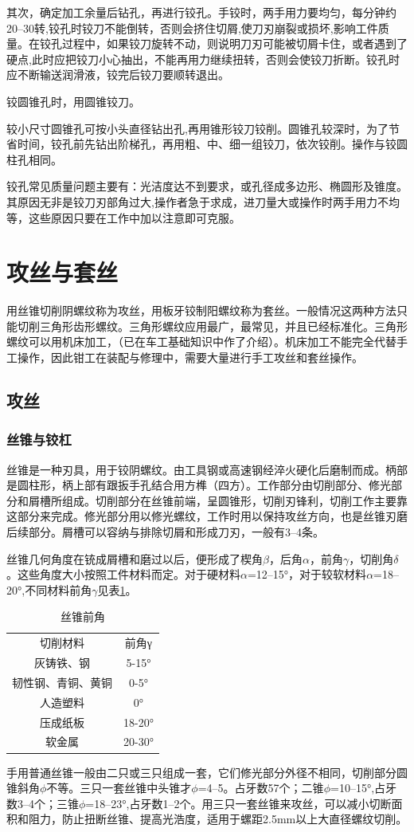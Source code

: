 \documentclass{ctexbook}
\begin{document}
其次，确定加工余量后钻孔，再进行铰孔。手铰时，两手用力要均匀，每分钟约20--30转,铰孔时铰刀不能倒转，否则会挤住切屑,使刀刃崩裂或损坏,影响工件质量。在铰孔过程中，如果铰刀旋转不动，则说明刀刃可能被切屑卡住，或者遇到了硬点,此时应把铰刀小心抽出，不能再用力继续扭转，否则会使铰刀折断。铰孔时应不断输送润滑液，铰完后铰刀要顺转退出。

铰圆锥孔时，用圆锥铰刀。

较小尺寸圆锥孔可按小头直径钻出孔,再用锥形铰刀铰削。圆锥孔较深时，为了节省时间，铰孔前先钻出阶梯孔，再用粗、中、细一组铰刀，依次铰削。操作与铰圆柱孔相同。

铰孔常见质量问题主要有：光洁度达不到要求，或孔径成多边形、椭圆形及锥度。其原因无非是铰刀刃部角过大,操作者急于求成，进刀量大或操作时两手用力不均等，这些原因只要在工作中加以注意即可克服。
\section{攻丝与套丝}
用丝锥切削阴螺纹称为攻丝，用板牙铰制阳螺纹称为套丝。一般情况这两种方法只能切削三角形齿形螺纹。三角形螺纹应用最广，最常见，并且已经标准化。三角形螺纹可以用机床加工，（已在车工基础知识中作了介绍）。机床加工不能完全代替手工操作，因此钳工在装配与修理中，需要大量进行手工攻丝和套丝操作。
\subsection{攻丝}
\subsubsection{丝锥与铰杠}
丝锥是一种刃具，用于铰阴螺纹。由工具钢或高速钢经淬火硬化后磨制而成。柄部是圆柱形，柄上部有跟扳手孔结合用方榫（四方）。工作部分由切削部分、修光部分和屑槽所组成。切削部分在丝锥前端，呈圆锥形，切削刃锋利，切削工作主要靠这部分来完成。修光部分用以修光螺纹，工作时用以保持攻丝方向，也是丝锥刃磨后续部分。屑槽可以容纳与排除切屑和形成刀刃，一般有3--4条。

丝锥几何角度在铳成屑槽和磨过以后，便形成了楔角$\beta$，后角$\alpha$，前角$\gamma$，切削角$\delta$。这些角度大小按照工件材料而定。对于硬材料$\alpha$=12--15°，对于较软材料$\alpha$=18--20°,不同材料前角$\gamma$见表\ref{tab:sizhuiqianjiao}。
\begin{table}[htbp]
	\centering
	\caption{丝锥前角}
	\begin{tabular}{cc}
		切削材料  & 前角γ \\
		灰铸铁、钢 & 5-15° \\
		韧性钢、青铜、黄铜 & 0-5° \\
		人造塑料  & 0° \\
		压成纸板  & 18-20° \\
		软金属   & 20-30° \\
	\end{tabular}%
	\label{tab:sizhuiqianjiao}%
\end{table}%
手用普通丝锥一般由二只或三只组成一套，它们修光部分外径不相同，切削部分圆锥斜角$\phi$不等。三只一套丝锥中头锥才$\phi$=4--5。占牙数57个；二锥$\phi$=10--15°,占牙数3--4个；三锥$\phi$=18--23°,占牙数1--2个。用三只一套丝锥来攻丝，可以减小切断面积和阻力，防止扭断丝锥、提高光浩度，适用于螺距2.5mm以上大直径螺纹切削。
\end{document}
